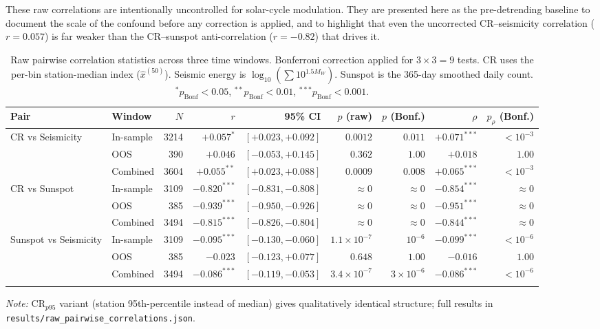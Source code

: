 \documentclass[12pt,a4paper]{article}
\begin{document}
These raw correlations are intentionally uncontrolled for solar-cycle
modulation.
They are presented here as the pre-detrending baseline to document the scale
of the confound before any correction is applied, and to highlight that even
the uncorrected CR--seismicity correlation ($r = 0.057$) is far weaker than
the CR--sunspot anti-correlation ($r = -0.82$) that drives it.

\begin{table}[htbp]
  \centering
  \caption{Raw pairwise correlation statistics across three time windows.
           Bonferroni correction applied for $3 \times 3 = 9$ tests.
           CR uses the per-bin station-median index ($\hat{x}^{(50)}$).
           Seismic energy is $\log_{10}\!\left(\sum 10^{1.5 M_W}\right)$.
           Sunspot is the 365-day smoothed daily count.
           $^{*}p_\text{Bonf}<0.05$, $^{**}p_\text{Bonf}<0.01$,
           $^{***}p_\text{Bonf}<0.001$.}
  \label{tab:rawcorr}
  \setlength{\tabcolsep}{4pt}
  \begin{tabular}{llrrrrrrr}
    \toprule
    Pair & Window & $N$ &
      $r$ & 95\% CI &
      $p$ (raw) & $p$ (Bonf.) &
      $\rho$ & $p_\rho$ (Bonf.) \\
    \midrule
    CR vs Seismicity & In-sample & 3214 & $+0.057^{*}$ & $[+0.023, +0.092]$ & $0.0012$ & $0.011$ & $+0.071^{***}$ & $<10^{-3}$ \\
     & OOS & 390 & $+0.046$ & $[-0.053, +0.145]$ & $0.362$ & $1.00$ & $+0.018$ & $1.00$ \\
     & Combined & 3604 & $+0.055^{**}$ & $[+0.023, +0.088]$ & $0.0009$ & $0.008$ & $+0.065^{***}$ & $<10^{-3}$ \\
    \addlinespace
    CR vs Sunspot & In-sample & 3109 & $-0.820^{***}$ & $[-0.831, -0.808]$ & $\approx 0$ & $\approx 0$ & $-0.854^{***}$ & $\approx 0$ \\
     & OOS & 385 & $-0.939^{***}$ & $[-0.950, -0.926]$ & $\approx 0$ & $\approx 0$ & $-0.951^{***}$ & $\approx 0$ \\
     & Combined & 3494 & $-0.815^{***}$ & $[-0.826, -0.804]$ & $\approx 0$ & $\approx 0$ & $-0.844^{***}$ & $\approx 0$ \\
    \addlinespace
    Sunspot vs Seismicity & In-sample & 3109 & $-0.095^{***}$ & $[-0.130, -0.060]$ & $1.1 \times 10^{-7}$ & $10^{-6}$ & $-0.099^{***}$ & $<10^{-6}$ \\
     & OOS & 385 & $-0.023$ & $[-0.123, +0.077]$ & $0.648$ & $1.00$ & $-0.016$ & $1.00$ \\
     & Combined & 3494 & $-0.086^{***}$ & $[-0.119, -0.053]$ & $3.4 \times 10^{-7}$ & $3 \times 10^{-6}$ & $-0.086^{***}$ & $<10^{-6}$ \\
    \addlinespace
    \bottomrule
  \end{tabular}

  \medskip
  \raggedright
  \textit{Note:} CR$_{p95}$ variant (station 95th-percentile instead of median)
  gives qualitatively identical structure; full results in
  \texttt{results/raw\_pairwise\_correlations.json}.
\end{table}
\end{document}
